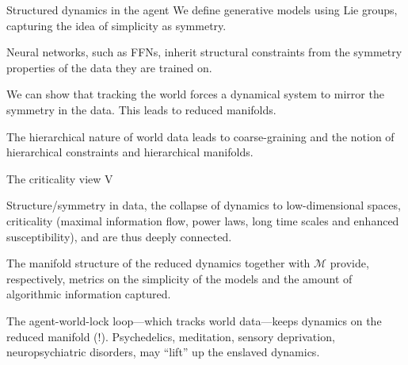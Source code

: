 \begin{frame}[label=st] {Structured dynamics in the agent \cite{ruffiniStructuredDynamicsAlgorithmic2023}}
     We define generative models using Lie groups, capturing the idea of simplicity as symmetry.
    
   
   Neural networks, such as FFNs, inherit structural constraints from the symmetry properties of the data they are trained on.
    
    
    We  can show that tracking the world forces a dynamical system to mirror the symmetry in the data. This leads to reduced manifolds. 
    
    The hierarchical nature of world data leads to coarse-graining and the notion of hierarchical constraints and hierarchical manifolds.
    
\end{frame}
\begin{frame}[label=ladila]{The criticality view V}

   Structure/symmetry in data, the collapse of dynamics to low-dimensional spaces, criticality (maximal information flow, power laws, long time scales and enhanced susceptibility),  \K and \SEP are thus deeply connected. \vfill 
   
The  manifold structure of the reduced dynamics together with  $\mathcal M$ provide, respectively, metrics on the simplicity of the  models and the amount of algorithmic information captured.  \vfill




The agent-world-lock loop---which tracks world   data---keeps dynamics on the reduced manifold (\SEP!). Psychedelics, meditation, sensory deprivation, neuropsychiatric disorders, may ``lift'' up the enslaved dynamics.
\end{frame}

